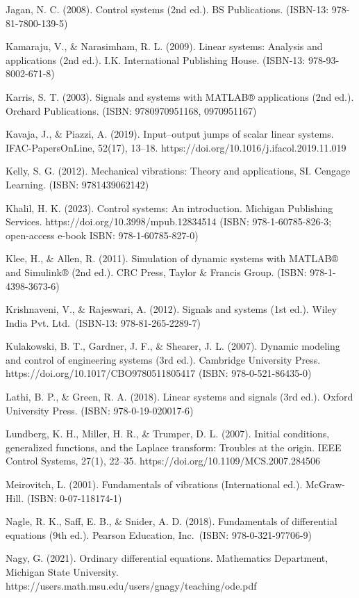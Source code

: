 \documentclass[
  11pt,
]{article}
\begin{document}
Jagan, N. C. (2008). Control systems (2nd ed.). BS Publications.
(ISBN-13: 978-81-7800-139-5)

Kamaraju, V., \& Narasimham, R. L. (2009). Linear systems: Analysis and
applications (2nd ed.). I.K. International Publishing House. (ISBN-13:
978-93-8002-671-8)

Karris, S. T. (2003). Signals and systems with MATLAB® applications (2nd
ed.). Orchard Publications. (ISBN: 9780970951168, 0970951167)

Kavaja, J., \& Piazzi, A. (2019). Input--output jumps of scalar linear
systems. IFAC-PapersOnLine, 52(17), 13--18.
https://doi.org/10.1016/j.ifacol.2019.11.019

Kelly, S. G. (2012). Mechanical vibrations: Theory and applications, SI.
Cengage Learning. (ISBN: 9781439062142)

Khalil, H. K. (2023). Control systems: An introduction. Michigan
Publishing Services. https://doi.org/10.3998/mpub.12834514 (ISBN:
978-1-60785-826-3; open-access e-book ISBN: 978-1-60785-827-0)

Klee, H., \& Allen, R. (2011). Simulation of dynamic systems with
MATLAB® and Simulink® (2nd ed.). CRC Press, Taylor \& Francis Group.
(ISBN: 978-1-4398-3673-6)

Krishnaveni, V., \& Rajeswari, A. (2012). Signals and systems (1st ed.).
Wiley India Pvt. Ltd.~(ISBN-13: 978-81-265-2289-7)

Kulakowski, B. T., Gardner, J. F., \& Shearer, J. L. (2007). Dynamic
modeling and control of engineering systems (3rd ed.). Cambridge
University Press. https://doi.org/10.1017/CBO9780511805417 (ISBN:
978-0-521-86435-0)

Lathi, B. P., \& Green, R. A. (2018). Linear systems and signals (3rd
ed.). Oxford University Press. (ISBN: 978-0-19-020017-6)

Lundberg, K. H., Miller, H. R., \& Trumper, D. L. (2007). Initial
conditions, generalized functions, and the Laplace transform: Troubles
at the origin. IEEE Control Systems, 27(1), 22--35.
https://doi.org/10.1109/MCS.2007.284506

Meirovitch, L. (2001). Fundamentals of vibrations (International ed.).
McGraw-Hill. (ISBN: 0-07-118174-1)

Nagle, R. K., Saff, E. B., \& Snider, A. D. (2018). Fundamentals of
differential equations (9th ed.). Pearson Education, Inc.~(ISBN:
978-0-321-97706-9)

Nagy, G. (2021). Ordinary differential equations. Mathematics
Department, Michigan State University.
https://users.math.msu.edu/users/gnagy/teaching/ode.pdf
\end{document}
